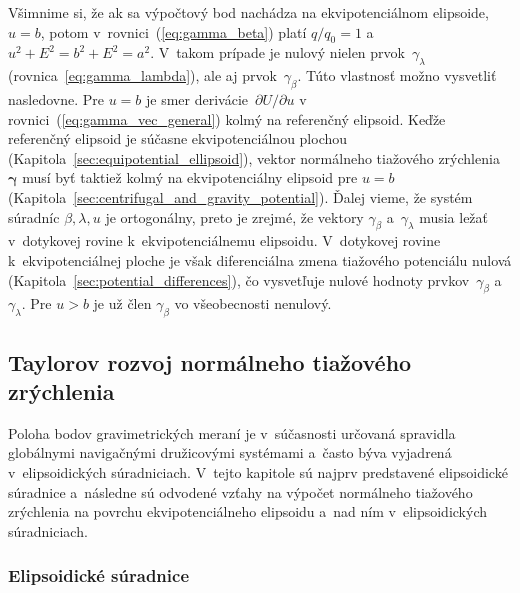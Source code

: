\documentclass[a4paper,12pt]{book}
\begin{document}
Všimnime si, že ak sa výpočtový bod nachádza na ekvipotenciálnom elipsoide, $u 
= b$, potom v~rovnici~(\ref{eq:gamma_beta}) platí $q \slash q_0 = 1$ a~$u^2 
+ E^2 = b^2 + E^2 = a^2$. V~takom prípade je nulový nielen 
prvok~$\gamma_\lambda$ (rovnica~\ref{eq:gamma_lambda}), ale aj 
prvok~$\gamma_\beta$.  Túto vlastnosť možno vysvetliť nasledovne.  Pre $u = b$ 
je smer derivácie~$\partial U \slash \partial u$ 
v rovnici~(\ref{eq:gamma_vec_general}) kolmý na referenčný elipsoid.  Keďže 
referenčný elipsoid je súčasne ekvipotenciálnou plochou 
(Kapitola~\ref{sec:equipotential_ellipsoid}), vektor normálneho tiažového 
zrýchlenia~$\boldsymbol \gamma$ musí byť taktiež kolmý na ekvipotenciálny 
elipsoid pre $u = b$ (Kapitola~\ref{sec:centrifugal_and_gravity_potential}).  
Ďalej vieme, že systém súradníc $\beta, \lambda, u$ je ortogonálny, preto je 
zrejmé, že vektory $\gamma_\beta$ a~$\gamma_\lambda$ musia ležať v~dotykovej 
rovine k~ekvipotenciálnemu elipsoidu.  V~dotykovej rovine k~ekvipotenciálnej 
ploche je však diferenciálna zmena tiažového potenciálu nulová 
(Kapitola~\ref{sec:potential_differences}), čo vysvetľuje nulové hodnoty 
prvkov~$\gamma_\beta$ a~$\gamma_\lambda$.  Pre $u > b$ je už člen 
$\gamma_\beta$ vo všeobecnosti nenulový.



\subsection{Taylorov rozvoj normálneho tiažového zrýchlenia}
\label{sec:normal_gravity_taylor}

Poloha bodov gravimetrických meraní je v~súčasnosti určovaná spravidla 
globálnymi navigačnými družicovými systémami a~často býva vyjadrená 
v~elipsoidických súradniciach.  V~tejto kapitole sú najprv predstavené 
elipsoidické súradnice a~následne sú odvodené vzťahy na výpočet normálneho 
tiažového zrýchlenia na povrchu ekvipotenciálneho elipsoidu a~nad ním 
v~elipsoidických súradniciach.

\subsubsection{Elipsoidické súradnice}
\end{document}
